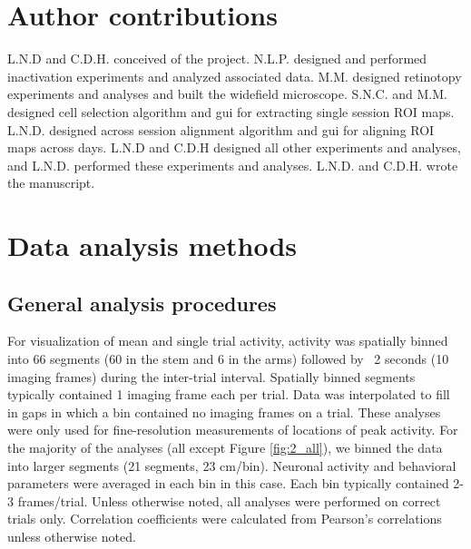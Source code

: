 \section{Author contributions}
L.N.D and C.D.H. conceived of the project. N.L.P. designed and performed inactivation experiments and analyzed associated data. M.M. designed retinotopy experiments and analyses and built the widefield microscope. S.N.C. and M.M. designed cell selection algorithm and gui for extracting single session ROI maps. L.N.D. designed across session alignment algorithm and gui for aligning ROI maps across days. L.N.D and C.D.H designed all other experiments and analyses, and L.N.D. performed these experiments and analyses. L.N.D. and C.D.H. wrote the manuscript. 

\section{Data analysis methods}
\subsection{General analysis procedures}
For visualization of mean and single trial activity, activity was spatially binned into 66 segments (60 in the stem and 6 in the arms) followed by ~2 seconds (10 imaging frames) during the inter-trial interval. Spatially binned segments typically contained 1 imaging frame each per trial. Data was interpolated to fill in gaps in which a bin contained no imaging frames on a trial. These analyses were only used for fine-resolution measurements of locations of peak activity. For the majority of the analyses (all except Figure \ref{fig:2_all}), we binned the data into larger segments (21 segments, 23 cm/bin). Neuronal activity and behavioral parameters were averaged in each bin in this case. Each bin typically contained 2-3 frames/trial. Unless otherwise noted, all analyses were performed on correct trials only. Correlation coefficients were calculated from Pearson's correlations unless otherwise noted.

